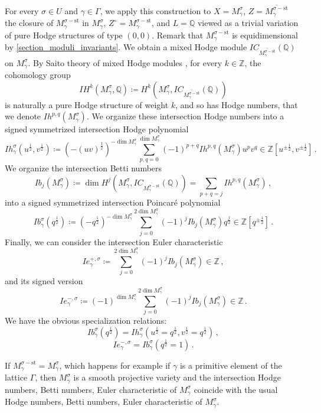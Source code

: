 \documentclass[12pt, a4paper]{amsart}
\newcommand\Q{\mathbb Q}
\newcommand\Z{\mathbb Z}
\newcommand\st{\mathrm{st}}
\begin{document}
For every $\sigma \in U$ and $\gamma \in \Gamma$, we apply this construction to 
$X=M_\gamma^{\sigma}$, $Z=\overline{M_\gamma^{\sigma-\st}}$ the closure
of $M_\gamma^{\sigma-\st}$ in $M_\gamma^{\sigma}$, $Z^\circ = M_\gamma^{\sigma-\st}$, and 
$L=\Q$ viewed as a trivial variation of pure Hodge structures of type $(0,0)$.
Remark that 
$M_\gamma^{\sigma-\st}$ is equidimensional by \cref{section_moduli_invariants}.
We obtain a mixed Hodge module $IC_{\overline{M_\gamma^{\sigma-\st}}}(\Q)$
on $M_\gamma^\sigma$.
By Saito theory of mixed Hodge modules \cite{MR1047415}, for every 
$k \in \Z$, the cohomology group
\[IH^{k}(M_\gamma^\sigma, \Q) \coloneq H^k(M_\gamma^\sigma, IC_{\overline{M_\gamma^{\sigma-\st}}}(\Q))\] 
is naturally a pure Hodge structure of weight $k$,
and so has Hodge numbers, that we denote $Ih^{p,q}(M_\gamma^\sigma)$.
We organize these intersection Hodge numbers into a signed symmetrized intersection  
Hodge polynomial 
\[Ih_\gamma^\sigma(u^{\frac{1}{2}},v^{\frac{1}{2}}) \coloneq 
(-(uv)^{\frac{1}{2}})^{- \dim M_\gamma^\sigma}
\sum_{p,q=0}^{\dim M_\gamma^\sigma}
(-1)^{p+q}
Ih^{p,q}(M_\gamma^\sigma) u^p v^q \in \Z[u^{\pm
\frac{1}{2}},v^{\pm \frac{1}{2}}] \,.\]
We organize the intersection Betti numbers
\[Ib_j(M_\gamma^\sigma) \coloneq \dim H^j(M_\gamma^\sigma, IC_{\overline{M_\gamma^{\sigma-\st}}}(\Q)) = \sum_{p+q=j} Ih^{p,q}(M_\gamma^\sigma)\,,\]
into a signed symmetrized intersection 
Poincar\'e polynomial 
\[ Ib_\gamma^\sigma(q^{\frac{1}{2}}) \coloneq 
(-q^{\frac{1}{2}})^{-\dim M_\gamma^\sigma}
\sum_{j=0}^{2\dim M_\gamma^\sigma}
(-1)^j
Ib_j(M_\gamma^\sigma) q^{\frac{j}{2}} \in \Z[q^{\pm \frac{1}{2}}]\,.\]
Finally, we can consider the intersection Euler characteristic
\[Ie_\gamma^{+,\sigma} \coloneq 
\sum_{j=0}^{2\dim M_\gamma^\sigma}
(-1)^j Ib_j(M_\gamma^\sigma) \in \Z\,,\]
and its signed version
\[Ie_\gamma^{-,\sigma} \coloneq 
(-1)^{\dim M_\gamma^\sigma}
\sum_{j=0}^{2\dim M_\gamma^\sigma}
(-1)^j Ib_j(M_\gamma^\sigma) \in \Z\,.\]
We have the obvious specialization relations:
\[Ib_\gamma^\sigma(q^{\frac{1}{2}}) = Ih_\gamma^\sigma(u^{\frac{1}{2}}
=q^{\frac{1}{2}}, v^{\frac{1}{2}}=q^{\frac{1}{2}})\,,\]
\[Ie_\gamma^{-,\sigma}=Ib_\gamma^\sigma(q^{\frac{1}{2}}=1)\,.\]

If $M_\gamma^{\sigma-\st}=M_\gamma^\sigma$, which happens for 
example if $\gamma$ is a primitive element of the lattice 
$\Gamma$, then $M_\gamma^\sigma$ is a smooth projective variety and the intersection Hodge numbers, Betti numbers, Euler characteristic of 
$M_\gamma^\sigma$ coincide with the usual Hodge numbers, Betti numbers, 
Euler characteristic of $M_\gamma^\sigma$.
\end{document}
